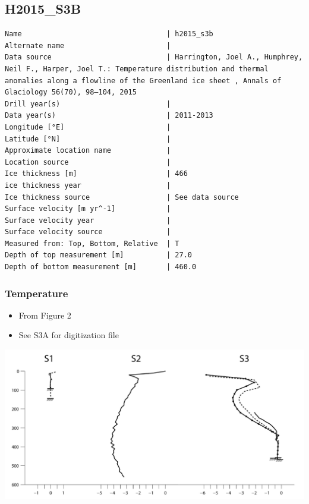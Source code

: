 \documentclass[article,a4paper,times,11pt,twoside]{article}
\begin{document}
\subsection{H2015\_S3B}
\label{sec:org91d3ec7}
\begin{verbatim}
Name                                  | h2015_s3b
Alternate name                        | 
Data source                           | Harrington, Joel A., Humphrey, Neil F., Harper, Joel T.: Temperature distribution and thermal anomalies along a flowline of the Greenland ice sheet , Annals of Glaciology 56(70), 98–104, 2015 
Drill year(s)                         | 
Data year(s)                          | 2011-2013
Longitude [°E]                        | 
Latitude [°N]                         | 
Approximate location name             | 
Location source                       | 
Ice thickness [m]                     | 466
ice thickness year                    | 
Ice thickness source                  | See data source
Surface velocity [m yr^-1]            | 
Surface velocity year                 | 
Surface velocity source               | 
Measured from: Top, Bottom, Relative  | T
Depth of top measurement [m]          | 27.0
Depth of bottom measurement [m]       | 460.0
\end{verbatim}

\subsubsection{Temperature}
\label{sec:orgea35fc4}

\begin{itemize}
\item From \textcite{harrington_2015} Figure 2
\item See S3A for digitization file
\end{itemize}

\begin{center}
\includegraphics[width=.9\linewidth]{h2015_s3b/harrington_2015_fig2_S1_S2_S3.png}
\end{center}
\end{document}
